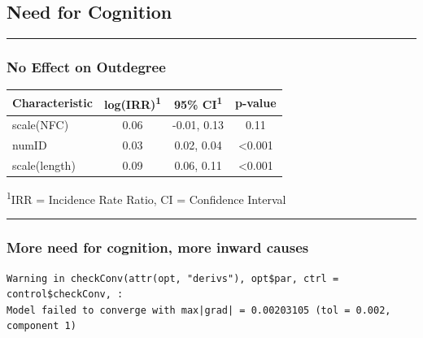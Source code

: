 \documentclass[
  .7em,
  letterpaper,
  DIV=11,
  numbers=noendperiod]{scrartcl}
\begin{document}
\hypertarget{need-for-cognition}{%
\subsection{Need for Cognition}\label{need-for-cognition}}

\begin{center}\rule{0.5\linewidth}{0.5pt}\end{center}

\hypertarget{no-effect-on-outdegree-3}{%
\subsubsection{No Effect on Outdegree}\label{no-effect-on-outdegree-3}}

\captionsetup[table]{labelformat=empty,skip=1pt}
\setlength{\LTpost}{0mm}
\begin{longtable}{lccc}
\toprule
\textbf{Characteristic} & \textbf{log(IRR)}\textsuperscript{1} & \textbf{95\% CI}\textsuperscript{1} & \textbf{p-value} \\ 
\midrule
scale(NFC) & 0.06 & -0.01, 0.13 & 0.11 \\ 
numID & 0.03 & 0.02, 0.04 & <0.001 \\ 
scale(length) & 0.09 & 0.06, 0.11 & <0.001 \\ 
\bottomrule
\end{longtable}
\begin{minipage}{\linewidth}
\textsuperscript{1}IRR = Incidence Rate Ratio, CI = Confidence Interval\\
\end{minipage}

\begin{center}\rule{0.5\linewidth}{0.5pt}\end{center}

\hypertarget{more-need-for-cognition-more-inward-causes}{%
\subsubsection{More need for cognition, more inward
causes}\label{more-need-for-cognition-more-inward-causes}}

\begin{verbatim}
Warning in checkConv(attr(opt, "derivs"), opt$par, ctrl = control$checkConv, :
Model failed to converge with max|grad| = 0.00203105 (tol = 0.002, component 1)
\end{verbatim}
\end{document}
